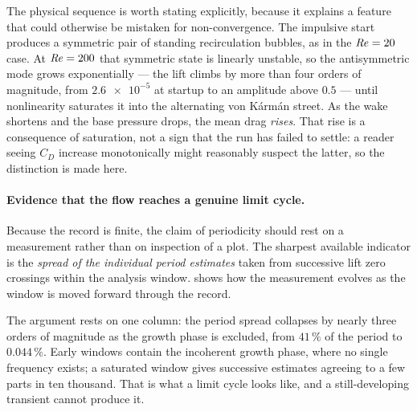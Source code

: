 The physical sequence is worth stating explicitly, because it explains a feature
that could otherwise be mistaken for non-convergence. The impulsive start produces
a symmetric pair of standing recirculation bubbles, as in the $\mathit{Re}=20$ case.
At $\mathit{Re}=200$ that symmetric state is linearly unstable, so the antisymmetric
mode grows exponentially --- the lift climbs by more than four orders of magnitude,
from $\num{2.6e-5}$ at startup to an amplitude above $0.5$ --- until nonlinearity
saturates it into the alternating von K\'arm\'an street. As the wake shortens and
the base pressure drops, the mean drag \emph{rises}. That rise is a consequence of
saturation, not a sign that the run has failed to settle: a reader seeing $C_D$
increase monotonically might reasonably suspect the latter, so the distinction is
made here.

\paragraph{Evidence that the flow reaches a genuine limit cycle.} Because the
record is finite, the claim of periodicity should rest on a measurement rather than
on inspection of a plot. The sharpest available indicator is the \emph{spread of
the individual period estimates} taken from successive lift zero crossings within
the analysis window.  shows how the measurement evolves as the
window is moved forward through the record.

\begin{table}[htbp]
  \centering
  \caption{Shedding statistics as the analysis window is advanced through the
  record, from \texttt{tools/transient\_status.py} reading \texttt{forces.csv}.
  Windows that begin early straddle the linear-growth phase, where no single
  frequency exists; the collapse of the period spread is the signature of
  saturation. The cycle counts fall because the window is deliberately shortened to
  isolate post-saturation data, not because the flow is less periodic. All rows are
  measured on the completed $t=300$ record; an earlier version of this table was taken
  from a mid-run snapshot at $t=54.8$ and three of its four rows did not survive the run's
  completion.}
  \label{tab:saturation}
  \small
  
\end{table}

The argument rests on one column: the period spread collapses by nearly three orders of
magnitude as the growth phase is excluded, from $41\,\%$ of the period to
$0.044\,\%$. Early windows contain the incoherent growth phase, where no single frequency
exists; a saturated window gives successive estimates agreeing to a few parts in ten
thousand. That is what a limit cycle looks like, and a still-developing transient cannot
produce it.

